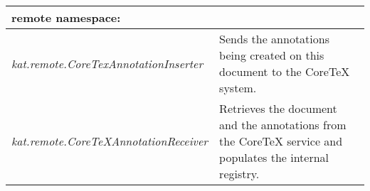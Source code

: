 \begin{longtable}{p{6cm}|p{8cm}}
 \textbf{remote} namespace: \\\hline
 \textit{kat.remote.CoreTexAnnotationInserter} & Sends the annotations being created on this document to the CoreTeX system.\\\hline
 \textit{kat.remote.CoreTeXAnnotationReceiver} & Retrieves the document and the annotations from the CoreTeX service and populates the internal registry. \\\hline
\end{longtable}



